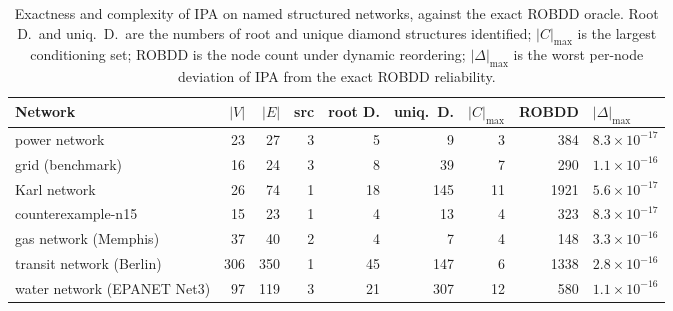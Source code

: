 \documentclass[preprint,12pt]{elsarticle}
\begin{document}
\begin{table}[ht]
\centering\small
\caption{Exactness and complexity of IPA on named structured networks, against the exact ROBDD oracle. Root D.\ and uniq.\ D.\ are the numbers of root and unique diamond structures identified; $|C|_{\max}$ is the largest conditioning set; ROBDD is the node count under dynamic reordering; $|\Delta|_{\max}$ is the worst per-node deviation of IPA from the exact ROBDD reliability.}
\label{tab:structured}
\begin{adjustbox}{max width=\linewidth}
\begin{tabular}{lrrrrrrrl}
\toprule
Network & $|V|$ & $|E|$ & src & root D. & uniq.\ D. & $|C|_{\max}$ & ROBDD & $|\Delta|_{\max}$ \\
\midrule
power network      & 23 & 27 & 3 &  5 &   9 &  3 &  384 & $8.3\times10^{-17}$ \\
grid (benchmark)   & 16 & 24 & 3 &  8 &  39 &  7 &  290 & $1.1\times10^{-16}$ \\
Karl network       & 26 & 74 & 1 & 18 & 145 & 11 & 1921 & $5.6\times10^{-17}$ \\
counterexample-n15 & 15 & 23 & 1 &  4 &  13 &  4 &  323 & $8.3\times10^{-17}$ \\
gas network (Memphis) & 37 & 40 & 2 & 4 & 7 & 4 & 148 & $3.3\times10^{-16}$ \\
transit network (Berlin) & 306 & 350 & 1 & 45 & 147 & 6 & 1338 & $2.8\times10^{-16}$ \\
water network (EPANET Net3) & 97 & 119 & 3 & 21 & 307 & 12 & 580 & $1.1\times10^{-16}$ \\
\bottomrule
\end{tabular}
\end{adjustbox}
\end{table}
\end{document}
